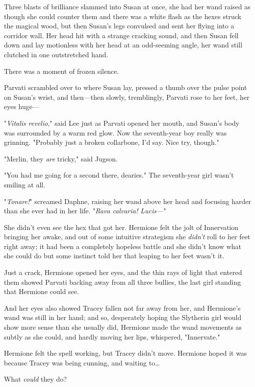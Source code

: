 Three blasts of brilliance slammed into Susan at once, she had her wand raised
as though she could counter them and there was a white flash as the hexes
struck the magical wood, but then Susan's legs convulsed and sent her flying
into a corridor wall. Her head hit with a strange cracking sound, and then
Susan fell down and lay motionless with her head at an odd-seeming angle, her
wand still clutched in one outstretched hand.

There was a moment of frozen silence.

Parvati scrambled over to where Susan lay, pressed a thumb over the pulse point
on Susan's wrist, and then---then slowly, tremblingly, Parvati rose to her
feet, her eyes huge---

"\emph{Vitalis revelio}," said Lee just as Parvati opened her mouth, and
Susan's body was surrounded by a warm red glow. Now the seventh-year boy really
was grinning. "Probably just a broken collarbone, I'd say. Nice try, though."

"Merlin, they \emph{are} tricky," said Jugson.

"You had me going for a second there, dearies." The seventh-year girl wasn't
smiling at all.

"\emph{Tonare!}" screamed Daphne, raising her wand above her head and focusing
harder than she ever had in her life. "\emph{Rava calvaria! Lucis---}"

She didn't even see the hex that got her.
\later
Hermione felt the jolt of Innervation bringing her awake, and out of some
intuitive strategism she \emph{didn't} roll to her feet right away; it had been
a completely hopeless battle and she didn't know what she could do but some
instinct told her that leaping to her feet wasn't it.

Just a crack, Hermione opened her eyes, and the thin rays of light that entered
them showed Parvati backing away from all three bullies, the last girl standing
that Hermione could see.

And her eyes also showed Tracey fallen not far away from her, and Hermione's
wand was still in her hand; and so, desperately hoping the Slytherin girl would
show more sense than she usually did, Hermione made the wand movements as
subtly as she could, and hardly moving her lips, whispered, "Innervate."

Hermione felt the spell working, but Tracey didn't move. Hermione hoped it was
because Tracey was being cunning, and waiting to{\ldots}

What \emph{could} they do?

